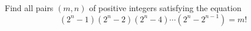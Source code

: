 Find all pairs $(m,n)$ of positive integers satisfying the equation
\[(2^n-1)(2^n-2)(2^n-4)\cdots(2^n-2^{n-1})=m!\]
